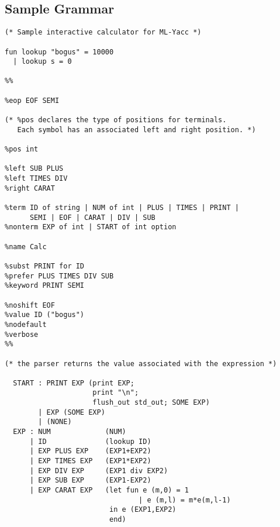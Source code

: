 \subsection{Sample Grammar}
\begin{tt}
\begin{verbatim}
(* Sample interactive calculator for ML-Yacc *)

fun lookup "bogus" = 10000
  | lookup s = 0

%%

%eop EOF SEMI

(* %pos declares the type of positions for terminals.
   Each symbol has an associated left and right position. *)

%pos int

%left SUB PLUS
%left TIMES DIV
%right CARAT

%term ID of string | NUM of int | PLUS | TIMES | PRINT |
      SEMI | EOF | CARAT | DIV | SUB
%nonterm EXP of int | START of int option

%name Calc

%subst PRINT for ID
%prefer PLUS TIMES DIV SUB
%keyword PRINT SEMI

%noshift EOF
%value ID ("bogus")
%nodefault
%verbose
%%

(* the parser returns the value associated with the expression *)

  START : PRINT EXP (print EXP;
                     print "\n";
                     flush_out std_out; SOME EXP)
        | EXP (SOME EXP)
        | (NONE)
  EXP : NUM             (NUM)
      | ID              (lookup ID)
      | EXP PLUS EXP    (EXP1+EXP2)
      | EXP TIMES EXP   (EXP1*EXP2)
      | EXP DIV EXP     (EXP1 div EXP2)
      | EXP SUB EXP     (EXP1-EXP2)
      | EXP CARAT EXP   (let fun e (m,0) = 1
                                | e (m,l) = m*e(m,l-1)
                         in e (EXP1,EXP2)       
                         end)
\end{verbatim}
\end{tt}
